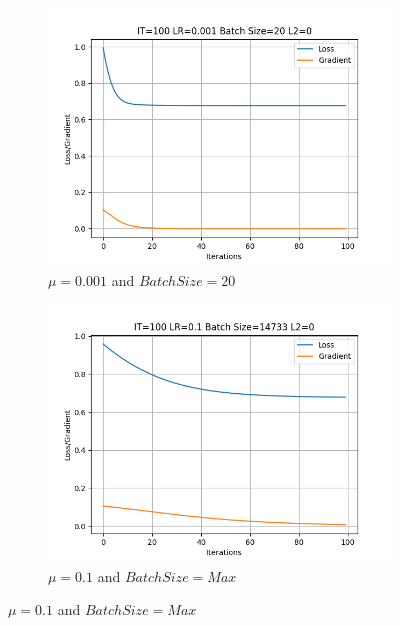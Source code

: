 \documentclass[
	letterpaper, %
	10pt, %
]{class}
\begin{document}
\begin{figure}
  \centering
  \begin{subfigure}{0.49\textwidth}
    \centering
    \includegraphics[width = \textwidth]{../data/IT=100_LR=0.001_BatchSize=20_L2=0.png}
    \caption{$\mu = 0.001$ and $Batch Size = 20$}
    \label{fig:left}
  \end{subfigure}
  \begin{subfigure}{0.49\textwidth}
    \centering
    \includegraphics[width = \textwidth]{../data/IT=100_LR=0.1_BatchSize=14733_L2=0.png}
    \caption{$\mu = 0.1 $ and $Batch Size = Max$}
    \label{fig:right}
  \end{subfigure}
  \label{fig:combined}
\end{figure}
\end{document}
